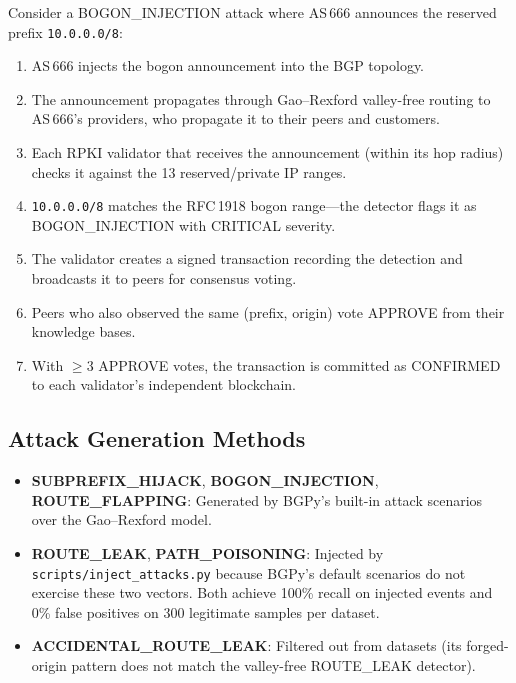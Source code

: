 \documentclass[11pt,a4paper]{article}
\begin{document}
Consider a BOGON\_INJECTION attack where AS\,666 announces the reserved prefix
\texttt{10.0.0.0/8}:

\begin{enumerate}
    \item AS\,666 injects the bogon announcement into the BGP topology.
    \item The announcement propagates through Gao--Rexford valley-free routing
          to AS\,666's providers, who propagate it to their peers and customers.
    \item Each RPKI validator that receives the announcement (within its hop
          radius) checks it against the 13 reserved/private IP ranges.
    \item \texttt{10.0.0.0/8} matches the RFC\,1918 bogon range---the detector
          flags it as BOGON\_INJECTION with CRITICAL severity.
    \item The validator creates a signed transaction recording the detection
          and broadcasts it to peers for consensus voting.
    \item Peers who also observed the same (prefix, origin) vote APPROVE from
          their knowledge bases.
    \item With $\geq$3 APPROVE votes, the transaction is committed as CONFIRMED
          to each validator's independent blockchain.
\end{enumerate}

\subsection{Attack Generation Methods}

\begin{itemize}
    \item \textbf{SUBPREFIX\_HIJACK}, \textbf{BOGON\_INJECTION}, \textbf{ROUTE\_FLAPPING}:
          Generated by BGPy's built-in attack scenarios over the Gao--Rexford model.
    \item \textbf{ROUTE\_LEAK}, \textbf{PATH\_POISONING}: Injected by
          \texttt{scripts/inject\_attacks.py} because BGPy's default scenarios do not
          exercise these two vectors. Both achieve 100\% recall on injected events and
          0\% false positives on 300 legitimate samples per dataset.
    \item \textbf{ACCIDENTAL\_ROUTE\_LEAK}: Filtered out from datasets (its
          forged-origin pattern does not match the valley-free ROUTE\_LEAK detector).
\end{itemize}
\end{document}
